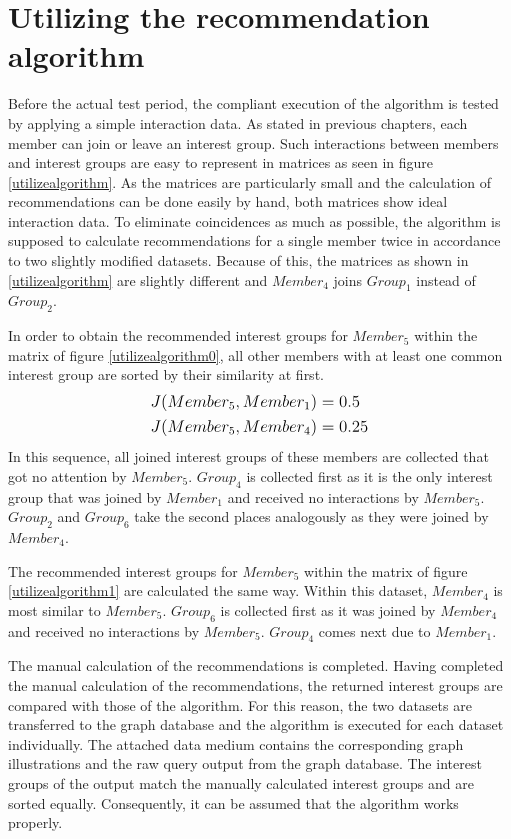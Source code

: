 \documentclass[12pt,numbers=noenddot,parskip,bibliography=totocnumbered,listof=totocnumbered,draft]{scrreprt}
\begin{document}
\section{Utilizing the recommendation algorithm}
Before the actual test period, the compliant execution of the algorithm is tested by applying a simple interaction data. As stated in previous chapters, each member can join or leave an interest group. Such interactions between members and interest groups are easy to represent in matrices as seen in figure \ref{utilizealgorithm}. As the matrices are particularly small and the calculation of recommendations can be done easily by hand, both matrices show ideal interaction data. To eliminate coincidences as much as possible, the algorithm is supposed to calculate recommendations for a single member twice in accordance to two slightly modified datasets. Because of this, the matrices as shown in \ref{utilizealgorithm} are slightly different and $\mathit{Member}_4$ joins $\mathit{Group}_1$ instead of $\mathit{Group}_2$.

In order to obtain the recommended interest groups for $\mathit{Member}_5$ within the matrix of figure \ref{utilizealgorithm0}, all other members with at least one common interest group are sorted by their similarity at first.
\begin{align*}
& \mathlarger{J(Member_5, Member_1) = 0.5} \\
& \mathlarger{J(Member_5, Member_4) = 0.25}
\end{align*}
In this sequence, all joined interest groups of these members are collected that got no attention by $\mathit{Member}_5$. $\mathit{Group}_4$ is collected first as it is the only interest group that was joined by $\mathit{Member}_1$ and received no interactions by $\mathit{Member}_5$. $\mathit{Group}_2$ and $\mathit{Group}_6$ take the second places analogously as they were joined by $\mathit{Member}_4$.

The recommended interest groups for $\mathit{Member}_5$ within the matrix of figure \ref{utilizealgorithm1} are calculated the same way. Within this dataset, $\mathit{Member}_4$ is most similar to $\mathit{Member}_5$. $\mathit{Group}_6$ is collected first as it was joined by $\mathit{Member}_4$ and received no interactions by $\mathit{Member}_5$. $\mathit{Group}_4$ comes next due to $\mathit{Member}_1$.

The manual calculation of the recommendations is completed. Having completed the manual calculation of the recommendations, the returned interest groups are compared with those of the algorithm. For this reason, the two datasets are transferred to the graph database and the algorithm is executed for each dataset individually. The attached data medium contains the corresponding graph illustrations and the raw query output from the graph database. The interest groups of the output match the manually calculated interest groups and are sorted equally. Consequently, it can be assumed that the algorithm works properly.
\end{document}
